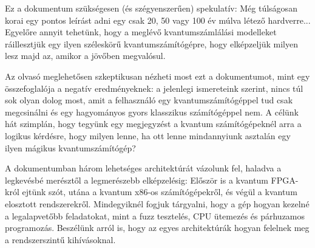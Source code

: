 \indent Ez a dokumentum szükségesen (és szégyenszerűen) spekulatív:
Még túlságosan korai egy pontos leírást adni egy csak 20, 50 vagy 100 év múlva létező hardverre...
Egyelőre annyit tehetünk, hogy a meglévő kvantumszámlálási modelleket ráillesztjük egy ilyen széleskörű kvantumszámítógépre, hogy elképzeljük milyen lesz majd az, amikor a jövőben megvalósul.

\indent Az olvasó meglehetősen szkeptikusan nézheti most ezt a dokumentumot, mint egy összefoglalója a negatív eredményeknek: a jelenlegi ismereteink szerint, nincs túl sok olyan dolog most, amit a felhasználó egy kvantumszámítógéppel tud csak megcsinálni és egy hagyományos gyors klasszikus számítógéppel nem.
A célünk hát szimplán, hogy tegyünk egy megjegyzést a kvantum számítógépeknél arra a logikus kérdésre, hogy milyen lenne, ha ott lenne mindannyiunk asztalán egy ilyen mágikus kvantumszámítógép?

\indent A dokumentumban három lehetséges architektúrát vázolunk fel, haladva a legkevésbé merésztől a legmerészebb elképzelésig:
Először is a kvantum FPGA-król ejtünk szót, utána a kvantum x86-os számítógépekről, és végül a kvantum elosztott rendszerekről.
Mindegyiknél fogjuk tárgyalni, hogy a gép hogyan kezelné a legalapvetőbb feladatokat, mint a fuzz tesztelés, CPU ütemezés és párhuzamos programozás.
Beszélünk arról is, hogy az egyes architektúrák hogyan felelnek meg a rendszerszintű kihívásoknal.
